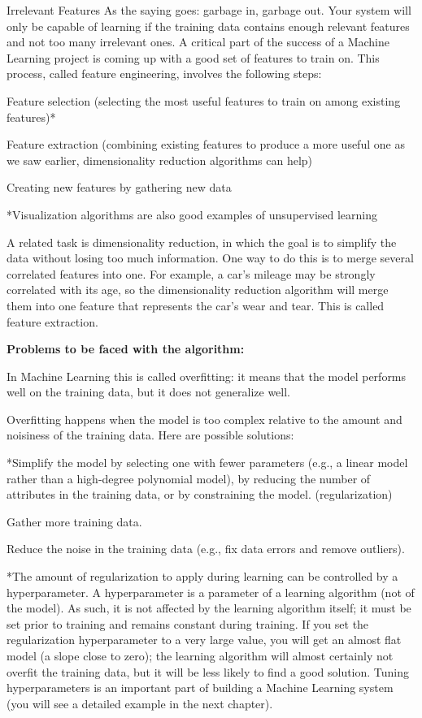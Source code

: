 \documentclass[12pt, a4paper]{article}
\begin{document}
	 Irrelevant Features
	 As the saying goes: garbage in, garbage out. Your system will only be capable of learning if the training data contains enough relevant features and not too many irrelevant ones. A critical part of the success of a Machine Learning project is coming up with a good set of features to train on. This process, called feature engineering, involves the following steps:
	 
	 Feature selection (selecting the most useful features to train on among existing features)*
	 
	 Feature extraction (combining existing features to produce a more useful one as we saw earlier, dimensionality reduction algorithms can help)
	 
	 Creating new features by gathering new data
	 
	 *Visualization algorithms are also good examples of unsupervised learning
	 
	 A related task is dimensionality reduction, in which the goal is to simplify the data without losing too much information. One way to do this is to merge several correlated features into one. For example, a car’s mileage may be strongly correlated with its age, so the dimensionality reduction algorithm will merge them into one feature that represents the car’s wear and tear. This is called feature extraction.
	 
	 \textbf{Problems to be faced with the algorithm:}
	 
	 In Machine Learning this is called overfitting: it means that the model performs well on the training data, but it does not generalize well.
	 
	 Overfitting happens when the model is too complex relative to the amount and noisiness of the training data. Here are possible solutions:
	 
	 *Simplify the model by selecting one with fewer parameters (e.g., a linear model rather than a high-degree polynomial model), by reducing the number of attributes in the training data, or by constraining the model. (regularization)
	 
	 Gather more training data.
	 
	 Reduce the noise in the training data (e.g., fix data errors and remove outliers).
	 
	 *The amount of regularization to apply during learning can be controlled by a hyperparameter. A hyperparameter is a parameter of a learning algorithm (not of the model). As such, it is not affected by the learning algorithm itself; it must be set prior to training and remains constant during training. If you set the regularization hyperparameter to a very large value, you will get an almost flat model (a slope close to zero); the learning algorithm will almost certainly not overfit the training data, but it will be less likely to find a good solution. Tuning hyperparameters is an important part of building a Machine Learning system (you will see a detailed example in the next chapter).
	 
\end{document}
